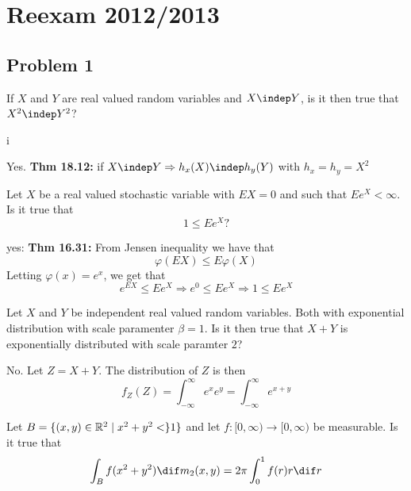 


\section{Reexam 2012/2013} %
\label{sec:reexam_2012_2013}
\subsection{Problem 1} %
\label{sub:problem_1}

\begin{problem}
If \(X\) and \(Y\)  are real valued random variables and \(X\indep Y\), is it then true that \(X^2\indep Y^2\)?
\end{problem}i
\begin{solution}
Yes. \textbf{Thm 18.12:} if \(X\indep Y \Rightarrow h_x(X)\indep h_y(Y)\) with \(h_x=h_y=X^2\)
\end{solution}
\begin{problem}
Let \(X\) be a real valued stochastic variable with \(EX=0\) and such that \(Ee^X<\infty\). Is it true that
\[
	1 \leq Ee^X?
\]
\end{problem}
\begin{solution}
yes: \textbf{Thm 16.31:} From Jensen inequality we have that
\[
	\varphi(EX) \leq E\varphi(X)
\]
Letting \(\varphi(x)=e^x\), we get that
\[
	e^{EX} \leq Ee^X \Rightarrow e^0 \leq Ee^X \Rightarrow 1 \leq Ee^X
\]
\end{solution}
\begin{problem}
Let \(X\) and \(Y\) be independent real valued random variables. Both with exponential distribution with scale paramenter \(\beta=1\). Is it then true that \(X+Y\) is exponentially distributed with scale paramter \(2\)?
\end{problem}
\begin{solution}
No. Let \(Z=X+Y\). The distribution of \(Z\) is then
\[
	f_Z(Z)=\int_{-\infty}^\infty e^{x}e^y = \int_{-\infty}^\infty e^{x+y}
\]
\end{solution}
\begin{problem}
Let \(B=\{(x,y)\in {\mathbb{R}}^2 \mid x^2+y^2 <\} 1 \}\) and let \(f:[0,\infty) \rightarrow [0,\infty)\) be measurable. Is it true that
\[
	\int_B f(x^2+y^2)\dif m_2(x,y) = 2\pi \int_0^1f(r)r\dif r
\]
\end{problem}
